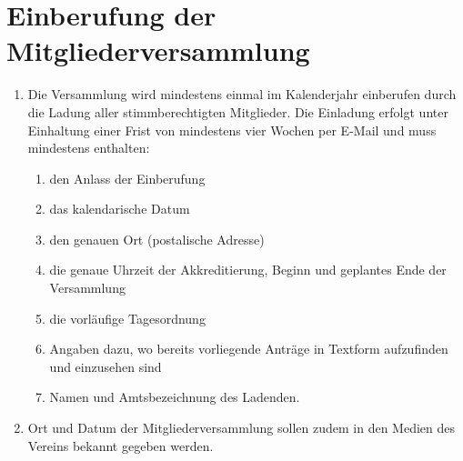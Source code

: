 \chapter{Einberufung der Mitgliederversammlung}
\begin{enumerate}
	\item  Die Versammlung wird mindestens einmal im Kalenderjahr einberufen durch die Ladung aller stimmberechtigten Mitglieder. Die Einladung erfolgt unter Einhaltung einer Frist von mindestens vier Wochen per E-Mail und muss mindestens enthalten:
		\begin{enumerate}[1)]
			\item den Anlass der Einberufung
			\item das kalendarische Datum
			\item den genauen Ort (postalische Adresse)
			\item die genaue Uhrzeit der Akkreditierung, Beginn und geplantes Ende der Versammlung
			\item die vorläufige Tagesordnung
			\item Angaben dazu, wo bereits vorliegende Anträge in Textform aufzufinden und einzusehen sind
			\item Namen und Amtsbezeichnung des Ladenden.
		\end{enumerate}
	\item Ort und Datum der Mitgliederversammlung sollen zudem in den Medien des Vereins bekannt gegeben werden.
\end{enumerate}

